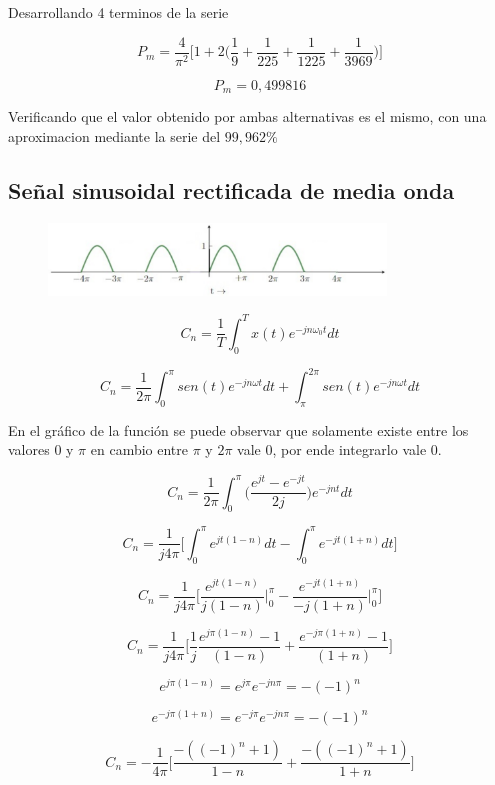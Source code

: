 Desarrollando 4 terminos de la serie

\[P_m = \dfrac{4}{\pi^2} \bigg[1 + 2 \bigg(\dfrac{1}{9} + \dfrac{1}{225} + \dfrac{1}{1225} + \dfrac{1}{3969} \bigg) \bigg] \]

$$P_m = 0,499816 $$

Verificando que el valor obtenido por ambas alternativas es el mismo, con una aproximacion mediante la serie del $99,962\percent$

\subsection{Se\~nal sinusoidal rectificada de media onda}

\begin{figure}[H]
  \centering
  \includegraphics[width=0.8\textwidth]{photos/onda_media.png}
\end{figure}

$$C_n = \dfrac{1}{T} \int_{0}^{T} x(t) e^{-jn\omega_0t} dt$$

$$C_n = \dfrac{1}{2\pi} \int_{0}^{\pi} sen(t) e^{-jn\omega t} dt + \int_{\pi}^{2\pi} sen(t) e^{-jn\omega t} dt $$

En el gr\'afico de la funci\'on se puede observar que solamente existe entre los valores $0$ y $\pi$ en cambio entre $\pi$ y $2\pi$ vale 0, por ende integrarlo vale 0.

$$C_n = \dfrac{1}{2\pi} \int_{0}^{\pi} \bigg(\dfrac{e^{jt} - e^{-jt}}{2j} \bigg) e^{-jnt} dt $$

$$C_n = \dfrac{1}{j4\pi} \bigg[\int_{0}^{\pi} e^{jt(1-n)} dt - \int_{0}^{\pi} e^{-jt(1+n)} dt \bigg] $$

$$C_n = \dfrac{1}{j4\pi} \bigg[\dfrac{e^{jt(1-n)}}{j(1-n)} \bigg\rvert_{0}^{\pi} - \dfrac{e^{-jt(1+n)}}{-j(1+n)} \bigg\rvert_{0}^{\pi} \bigg] $$

$$C_n = \dfrac{1}{j4\pi} \bigg[\dfrac{1}{j} \dfrac{e^{j\pi(1-n)}-1}{(1-n)} + \dfrac{e^{-j\pi(1+n)}-1}{(1+n  )} \bigg] $$

$$e^{j\pi(1-n)} = e^{j\pi} e^{-jn\pi} = -(-1)^n $$

$$e^{-j\pi(1+n)} = e^{-j\pi} e^{-jn\pi} = -(-1)^n $$

$$C_n = -\dfrac{1}{4\pi} \bigg[\dfrac{-((-1)^n + 1)}{1-n} + \dfrac{-((-1)^n + 1)}{1+n} \bigg] $$

